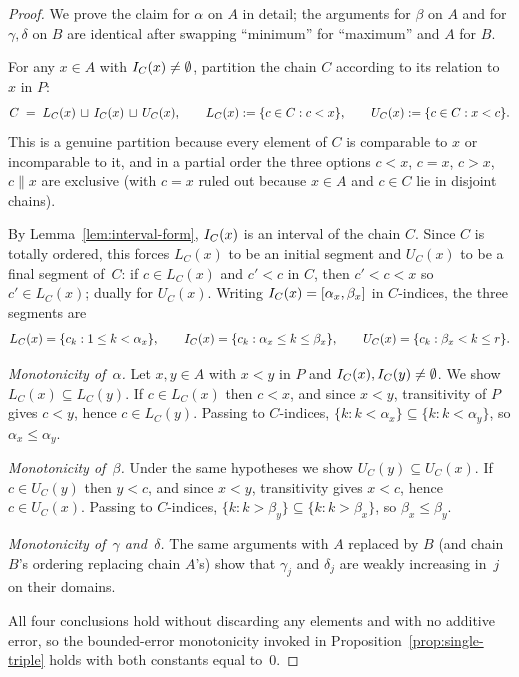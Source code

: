 \begin{proof}
We prove the claim for $\alpha$ on $A$ in detail; the arguments for $\beta$
on $A$ and for $\gamma, \delta$ on $B$ are identical after swapping
``minimum'' for ``maximum'' and $A$ for $B$.

For any $x \in A$ with $I_C(x) \neq \emptyset$, partition the chain $C$
according to its relation to $x$ in $P$:
\[
C \;=\; L_C(x) \,\sqcup\, I_C(x) \,\sqcup\, U_C(x),
\qquad
L_C(x) := \{c \in C : c < x\},\qquad
U_C(x) := \{c \in C : x < c\}.
\]
This is a genuine partition because every element of $C$ is comparable to $x$
or incomparable to it, and in a partial order the three options $c < x$,
$c = x$, $c > x$, $c \parallel x$ are exclusive (with $c = x$ ruled out because
$x \in A$ and $c \in C$ lie in disjoint chains).

By Lemma~\ref{lem:interval-form}, $I_C(x)$ is an interval of the chain $C$.
Since $C$ is totally ordered, this forces $L_C(x)$ to be an initial segment
and $U_C(x)$ to be a final segment of~$C$: if $c \in L_C(x)$ and $c' < c$ in
$C$, then $c' < c < x$ so $c' \in L_C(x)$; dually for $U_C(x)$. Writing
$I_C(x) = [\alpha_x, \beta_x]$ in $C$-indices, the three segments are
\[
L_C(x) = \{c_k : 1 \le k < \alpha_x\},\qquad
I_C(x) = \{c_k : \alpha_x \le k \le \beta_x\},\qquad
U_C(x) = \{c_k : \beta_x < k \le r\}.
\]

\smallskip

\noindent\emph{Monotonicity of~$\alpha$.}
Let $x, y \in A$ with $x < y$ in $P$ and $I_C(x), I_C(y) \neq \emptyset$.
We show $L_C(x) \subseteq L_C(y)$. If $c \in L_C(x)$ then $c < x$, and since
$x < y$, transitivity of $P$ gives $c < y$, hence $c \in L_C(y)$. Passing to
$C$-indices, $\{k : k < \alpha_x\} \subseteq \{k : k < \alpha_y\}$, so
$\alpha_x \le \alpha_y$.

\smallskip

\noindent\emph{Monotonicity of~$\beta$.}
Under the same hypotheses we show $U_C(y) \subseteq U_C(x)$. If $c \in U_C(y)$
then $y < c$, and since $x < y$, transitivity gives $x < c$, hence
$c \in U_C(x)$. Passing to $C$-indices,
$\{k : k > \beta_y\} \subseteq \{k : k > \beta_x\}$, so $\beta_x \le \beta_y$.

\smallskip

\noindent\emph{Monotonicity of~$\gamma$ and~$\delta$.}
The same arguments with $A$ replaced by $B$ (and chain $B$'s ordering
replacing chain $A$'s) show that $\gamma_j$ and $\delta_j$ are weakly
increasing in~$j$ on their domains.

\smallskip

All four conclusions hold without discarding any elements and with no
additive error, so the bounded-error monotonicity invoked in
Proposition~\ref{prop:single-triple} holds with both constants equal to~$0$.
\end{proof}

